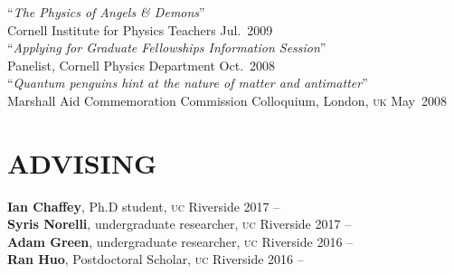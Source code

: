 \documentclass[margin,line]{resume}
\newcommand{\mytalksep}{-.1mm}
\newcommand{\mytalkskip}{2mm}
\newcommand{\scap}[1]{\textsc{\MakeLowercase{#1}}}
\begin{document}
\begin{resume}
%
``\emph{The Physics of \emph{Angels \& Demons}}''\vspace{\mytalksep}\\ 
Cornell Institute for Physics Teachers \hfill Jul.~{2009}\vspace{\mytalkskip}\\ 
%
``\emph{Applying for Graduate Fellowships Information Session}''\vspace{\mytalksep}\\ 
Panelist, Cornell Physics Department \hfill Oct.~{2008}\vspace{\mytalkskip}\\ 
%
``\emph{Quantum penguins hint at the nature of matter and antimatter}'' \vspace{\mytalksep}\\ 
Marshall Aid Commemoration Commission Colloquium, London, \scap{UK}
\hfill %
May~2008%




\section{\footnotesize \sc
\sffamily 
{}ADVISING
}

\textbf{Ian Chaffey}, Ph.D student, \scap{UC} Riverside
 \hfill {2017 -- \phantom{2017}}\\
%
\textbf{Syris Norelli}, undergraduate researcher, \scap{UC} Riverside
 \hfill {2017 -- \phantom{2017}}\\
%
\textbf{Adam Green}, undergraduate researcher, \scap{UC} Riverside
 \hfill {2016 -- \phantom{2017}}\\
%
\textbf{Ran Huo}, Postdoctoral Scholar, \scap{UC} Riverside
 \hfill {2016 -- \phantom{2017}}\\






\end{resume}
\end{document}
